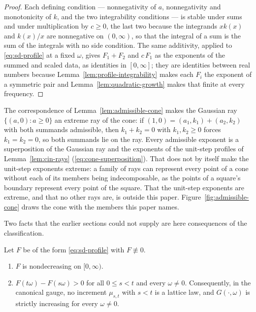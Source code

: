 \begin{proof}
Each defining condition --- nonnegativity of $a$, nonnegativity and monotonicity of $k$, and
the two integrability conditions --- is stable under sums and under multiplication by $c \ge 0$,
the last two because the integrands $x k(x)$ and $k(x)/x$ are nonnegative on $(0,\infty)$, so that
the integral of a sum is the sum of the integrals with no side condition. The same additivity,
applied to \ref{eq:sd-profile} at a fixed $\omega$, gives $F_1 + F_2$ and $c\,F_1$ as the
exponents of the summed and scaled data, as identities in $[0,\infty]$; they are identities
between real numbers because Lemma~\ref{lem:profile-integrability} makes each $F_i$ the
exponent of a symmetric \Levy{} pair and Lemma~\ref{lem:quadratic-growth} makes that finite at
every frequency.
\end{proof}

\begin{remark}\label{rem:gaussian-extreme}
The correspondence of Lemma~\ref{lem:admissible-cone} makes the Gaussian ray
$\{(a,0) : a \ge 0\}$ an extreme ray of the cone: if $(1,0) = (a_1,k_1) + (a_2,k_2)$ with both
summands admissible, then $k_1 + k_2 = 0$ with $k_1, k_2 \ge 0$ forces $k_1 = k_2 = 0$, so
both summands lie on the ray. Every admissible exponent is a superposition of the Gaussian
ray and the exponents of the unit-step profiles of Lemma~\ref{lem:cin-rays}
(\ref{eq:cone-superposition}). That does not by itself make the unit-step exponents extreme:
a family of rays can represent every point of a cone without each of its members being
indecomposable, as the points of a square's boundary represent every point of the square.
That the unit-step exponents are extreme, and that no other rays are, is outside this
paper. Figure~\ref{fig:admissible-cone} draws the cone with the members this paper names.
\end{remark}



Two facts that the earlier sections could not supply are here consequences of the
classification.

\begin{proposition}
\label{prop:strict-positivity}
Let $F$ be of the form \ref{eq:sd-profile} with $F \not\equiv 0$.
\begin{enumerate}
\item $F$ is nondecreasing on $[0,\infty)$.
\item $F(t\omega) - F(s\omega) > 0$ for all $0 \le s < t$ and every $\omega \ne 0$.
Consequently, in the canonical gauge, no increment $\mu_{s,t}$ with $s < t$ is a lattice law,
and $G(\cdot,\omega)$ is strictly increasing for every $\omega \ne 0$.
\end{enumerate}
\end{proposition}

